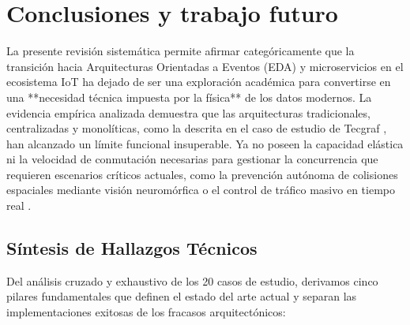 \section{Conclusiones y trabajo futuro}

La presente revisión sistemática permite afirmar categóricamente que la transición hacia Arquitecturas Orientadas a Eventos (EDA) y microservicios en el ecosistema IoT ha dejado de ser una exploración académica para convertirse en una **necesidad técnica impuesta por la física** de los datos modernos. La evidencia empírica analizada demuestra que las arquitecturas tradicionales, centralizadas y monolíticas, como la descrita en el caso de estudio de Tecgraf \cite{laigner2020monolithic}, han alcanzado un límite funcional insuperable. Ya no poseen la capacidad elástica ni la velocidad de conmutación necesarias para gestionar la concurrencia que requieren escenarios críticos actuales, como la prevención autónoma de colisiones espaciales mediante visión neuromórfica \cite{coretti2025neuromorphic} o el control de tráfico masivo en tiempo real \cite{perera2024traffic}.

\subsection{Síntesis de Hallazgos Técnicos}
Del análisis cruzado y exhaustivo de los 20 casos de estudio, derivamos cinco pilares fundamentales que definen el estado del arte actual y separan las implementaciones exitosas de los fracasos arquitectónicos:

